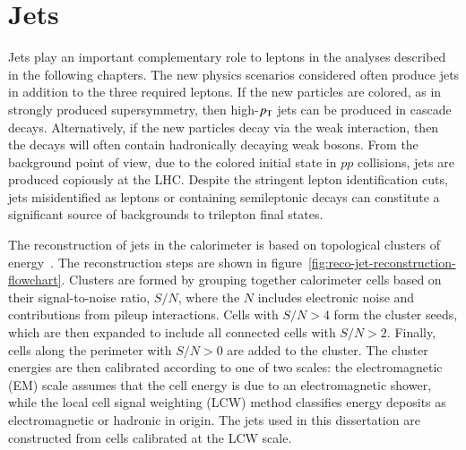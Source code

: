 \section{Jets}\label{sec:reco-jets}
Jets play an important complementary role to leptons in the analyses described in the following chapters. The new physics scenarios considered often produce jets in addition to the three required leptons. If the new particles are colored, as in strongly produced supersymmetry, then high-$p_{\text{T}}$ jets can be produced in cascade decays. Alternatively, if the new particles decay via the weak interaction, then the decays will often contain hadronically decaying weak bosons. From the background point of view, due to the colored initial state in $pp$ collisions, jets are produced copiously at the LHC. Despite the stringent lepton identification cuts, jets misidentified as leptons or containing semileptonic decays can constitute a significant source of backgrounds to trilepton final states.

The reconstruction of jets in the calorimeter is based on topological clusters of energy~\cite{TheATLASCollaboration:2011ks,TheATLASCollaboration:2015ds}. The reconstruction steps are shown in figure~\ref{fig:reco-jet-reconstruction-flowchart}. Clusters are formed by grouping together calorimeter cells based on their signal-to-noise ratio, $S/N$, where the $N$ includes electronic noise and contributions from pileup interactions. Cells with $S/N>4$ form the cluster seeds, which are then expanded to include all connected cells with $S/N>2$. Finally, cells along the perimeter with $S/N>0$ are added to the cluster. The cluster energies are then calibrated according to one of two scales: the electromagnetic (EM) scale assumes that the cell energy is due to an electromagnetic shower, while the local cell signal weighting (LCW) method classifies energy deposits as electromagnetic or hadronic in origin. The jets used in this dissertation are constructed from cells calibrated at the LCW scale.

